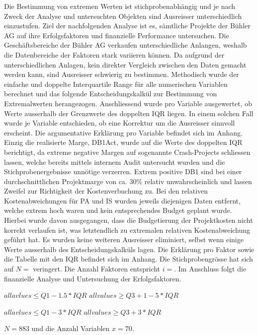 Die Bestimmung von extremen Werten ist stichprobenabhängig und je nach Zweck der Analyse und untersuchten Objekten sind Ausreisser unterschiedlich einzustufen. Ziel der nachfolgenden Analyse ist es, sämtliche Projekte der Bühler AG auf ihre Erfolgsfaktoren und finanzielle Performance untersuchen. Die Geschäftsbereiche der Bühler AG verkaufen unterschiedliche Anlangen, weshalb die Datenbereiche der Faktoren stark variieren können. Da aufgrund der unterschiedlichen Anlagen, kein direkter Vergleich zwischen den Daten gemacht werden kann, sind Ausreisser schwierig zu bestimmen. Methodisch wurde der einfache und doppelte Interquartile Range für alle numerischen Variablen berechnet und das folgende Entscheidungskalkül zur Bestimmung von Extremalwerten herangezogen. Anschliessend wurde pro Variable ausgewertet, ob Werte ausserhalb der Grenzwerte des doppelten IQR liegen. In einem solchen Fall wurde je Variable entschieden, ob eine Korrektur um die Ausreisser sinnvoll erscheint. Die argumentative Erklärung pro Variable befindet sich im Anhang. Einzig die realisierte Marge, DB1Act, wurde auf die Werte des doppelten IQR berichtigt, da extreme negative Margen auf sogenannte Crash-Projects schliessen lassen, welche bereits mittels internem Audit untersucht wurden und die Stichprobenergebnisse unnötige verzerren. Extrem positive DB1 sind bei einer durchschnittlichen Projektmarge von ca. 30\% relativ unwahrscheinlich und lassen Zweifel zur Richtigkeit der Kostenverbuchung zu. Bei den  relativen Kostenabweichungen für PA und IS wurden jeweils diejenigen Daten entfernt, welche extrem hoch waren und kein entsprechendes Budget geplant wurde. Hierbei wurde davon ausgegangen, dass die Budgetierung der Projektkosten nicht korrekt verlaufen ist, was letztendlich zu extremalen relativen Kostenabweichung geführt hat. Es wurden keine weiteren Ausreisser eliminiert, selbst wenn einige Werte ausserhalb des Entscheidungskalküls lagen. Die Erklärung pro Faktor sowie die Tabelle mit den IQR befindet sich im Anhang. Die Stichprobengrösse hat sich auf $N = $ veringert. Die Anzahl Faktoren entspricht $ i = $. Im Anschluss folgt die finanzielle Analyse und Untersuchung der Erfolgsfaktoren. 
\newline\newline
\begin{centering}
		$ all avlues \leq Q1 - 1.5 * IQR$
		\newline
		$ all values \geq Q3 + 1-5 * IQR$
\end{centering}
\newline
\newline
\begin{centering}
		$ all avlues \leq Q1 - 3 * IQR$
		\newline
		$ all values \geq Q3 + 3 * IQR$
\end{centering}
\newline\newline
 $N = 883 $ und die Anzahl Variablen $ x = 70$.
